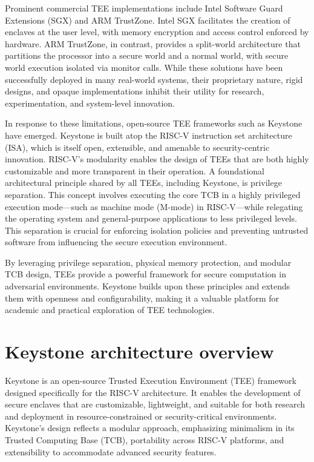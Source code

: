 Prominent commercial TEE implementations include Intel Software Guard Extensions (SGX) and ARM TrustZone. Intel SGX facilitates the creation of enclaves at the user level, with memory encryption and access control enforced by hardware. ARM TrustZone, in contrast, provides a split-world architecture that partitions the processor into a secure world and a normal world, with secure world execution isolated via monitor calls. While these solutions have been successfully deployed in many real-world systems, their proprietary nature, rigid designs, and opaque implementations inhibit their utility for research, experimentation, and system-level innovation.

In response to these limitations, open-source TEE frameworks such as Keystone have emerged. Keystone is built atop the RISC-V instruction set architecture (ISA), which is itself open, extensible, and amenable to security-centric innovation. RISC-V’s modularity enables the design of TEEs that are both highly customizable and more transparent in their operation. A foundational architectural principle shared by all TEEs, including Keystone, is privilege separation. This concept involves executing the core TCB in a highly privileged execution mode—such as machine mode (M-mode) in RISC-V—while relegating the operating system and general-purpose applications to less privileged levels. This separation is crucial for enforcing isolation policies and preventing untrusted software from influencing the secure execution environment.

By leveraging privilege separation, physical memory protection, and modular TCB design, TEEs provide a powerful framework for secure computation in adversarial environments. Keystone builds upon these principles and extends them with openness and configurability, making it a valuable platform for academic and practical exploration of TEE technologies.

\section{Keystone architecture overview}

Keystone is an open-source Trusted Execution Environment (TEE) framework designed specifically for the RISC-V architecture. It enables the development of secure enclaves that are customizable, lightweight, and suitable for both research and deployment in resource-constrained or security-critical environments. Keystone’s design reflects a modular approach, emphasizing minimalism in its Trusted Computing Base (TCB), portability across RISC-V platforms, and extensibility to accommodate advanced security features. \cite{Lee2019}

